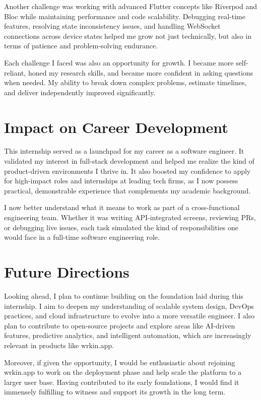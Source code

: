 Another challenge was working with advanced Flutter concepts like Riverpod and Bloc while maintaining performance and code scalability. Debugging real-time features, resolving state inconsistency issues, and handling WebSocket connections across device states helped me grow not just technically, but also in terms of patience and problem-solving endurance.

Each challenge I faced was also an opportunity for growth. I became more self-reliant, honed my research skills, and became more confident in asking questions when needed. My ability to break down complex problems, estimate timelines, and deliver independently improved significantly.

\section{Impact on Career Development}

This internship served as a launchpad for my career as a software engineer. It validated my interest in full-stack development and helped me realize the kind of product-driven environments I thrive in. It also boosted my confidence to apply for high-impact roles and internships at leading tech firms, as I now possess practical, demonstrable experience that complements my academic background.

I now better understand what it means to work as part of a cross-functional engineering team. Whether it was writing API-integrated screens, reviewing PRs, or debugging live issues, each task simulated the kind of responsibilities one would face in a full-time software engineering role.

\section{Future Directions}

Looking ahead, I plan to continue building on the foundation laid during this internship. I aim to deepen my understanding of scalable system design, DevOps practices, and cloud infrastructure to evolve into a more versatile engineer. I also plan to contribute to open-source projects and explore areas like AI-driven features, predictive analytics, and intelligent automation, which are increasingly relevant in products like wrkin.app.

Moreover, if given the opportunity, I would be enthusiastic about rejoining wrkin.app to work on the deployment phase and help scale the platform to a larger user base. Having contributed to its early foundations, I would find it immensely fulfilling to witness and support its growth in the long term.

